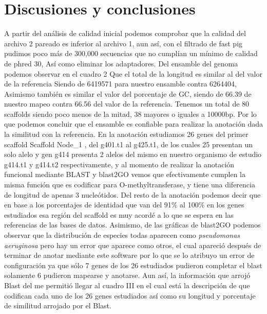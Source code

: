 \documentclass[journal, letterpaper, 11pt]{IEEEtran}
\begin{document}
\section{Discusiones y conclusiones}
A partir del análisis de calidad inicial podemos comprobar que la calidad del archivo 2 pareado es inferior al archivo 1, aun así, con el filtrado de fast pig pudimos poco más de 300,000 secuencias que no cumplían un mínimo de calidad de phred 30, Así como eliminar los adaptadores. Del ensamble del genoma podemos observar en el cuadro 2 Que el total de la longitud es similar al del valor de la referencia Siendo de 6419571 para nuestro ensamble contra 6264404, Asimismo también es similar el valor del porcentaje de GC, siendo de 66.39 de nuestro mapeo contra 66.56 del valor de la referencia. Tenemos un total de 80 scaffolds siendo poco menos de la mitad, 38 mayores o iguales a 10000bp. Por lo que podemos concluir que el ensamble es confiable para realizar la anotación dada la similitud con la referencia.
En la anotación estudiamos 26 genes del primer scaffold  Scaffold Node\_1 , del g401.t1 al g425.t1,  de los cuales 25 presentan un solo alelo y gen g414 presenta  2 alelos del mismo en nuestro organismo de estudio g414.t1 y g414.t2 respectivamente, y al momento de realizar la anotación funcional mediante BLAST y blast2GO vemos que efectivamente cumplen la misma función que es codificar para O-methyltransferase, y tiene una diferencia de longitud de apenas 3 nucleótidos. Del resto de la anotación podemos decir que en base a los porcentajes de identidad que van del 91\% al 100\% en los genes estudiados esa región del scaffold es muy acordé a lo que se espera en las referencias de las bases de datos. Asimismo, de las gráficas de blast2GO podemos observar que la distribución de especies todas aparecen como \textit{pseudomonas aeruginosa} pero hay un error que aparece como otros, el cual apareció después de terminar de anotar mediante este software por lo que se lo atribuyo un error de configuración ya que sólo 7 genes de los 26 estudiados pudieron completar el blast solamente 6 pudieron mapearse y anotarse. Aun así, la información que arrojó Blast del me permitió llegar al cuadro III en el cual está la descripción de que codifican cada uno de los 26 genes estudiados así como su longitud y porcentaje de similitud arrojado por el Blast.


\appendices
\end{document}
